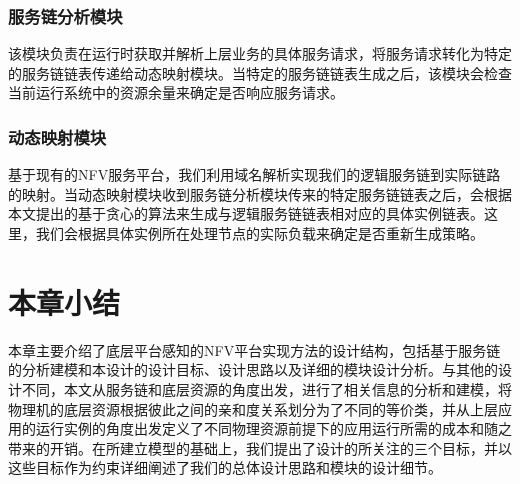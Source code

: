 \subsubsection{服务链分析模块}
该模块负责在运行时获取并解析上层业务的具体服务请求，将服务请求转化为特定的服务链链表传递给动态映射模块。当特定的服务链链表生成之后，该模块会检查当前运行系统中的资源余量来确定是否响应服务请求。

\subsubsection{动态映射模块}
基于现有的NFV服务平台，我们利用域名解析实现我们的逻辑服务链到实际链路的映射。当动态映射模块收到服务链分析模块传来的特定服务链链表之后，会根据本文提出的基于贪心的算法来生成与逻辑服务链链表相对应的具体实例链表。这里，我们会根据具体实例所在处理节点的实际负载来确定是否重新生成策略。

\section{本章小结}
本章主要介绍了底层平台感知的NFV平台实现方法的设计结构，包括基于服务链的分析建模和本设计的设计目标、设计思路以及详细的模块设计分析。与其他的设计不同，本文从服务链和底层资源的角度出发，进行了相关信息的分析和建模，将物理机的底层资源根据彼此之间的亲和度关系划分为了不同的等价类，并从上层应用的运行实例的角度出发定义了不同物理资源前提下的应用运行所需的成本和随之带来的开销。在所建立模型的基础上，我们提出了设计的所关注的三个目标，并以这些目标作为约束详细阐述了我们的总体设计思路和模块的设计细节。